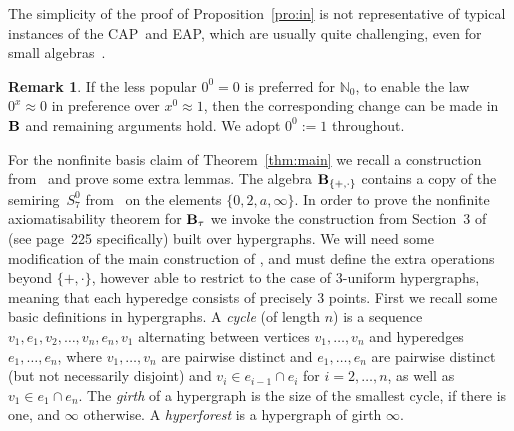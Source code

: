 \documentclass[eqnor,reqno]{amsart}
\theoremstyle{plain}
\theoremstyle{definition}
\newtheorem{remark}[thm]{Remark}
\newcommand{\EAP}{\textsf{EAP}}
\newcommand{\CAP}{\textsf{CAP}}
\begin{document}
The simplicity of the proof of Proposition~\ref{pro:in} is not representative of typical instances of the \CAP\ and \EAP, which are usually quite challenging, even for small algebras~\cite{asa}.
\begin{remark}
If the less popular $0^0=0$ is preferred for $\mathbb{N}_0$, to enable the law $0^x\approx 0$ in preference over $x^0\approx 1$, then the corresponding change can be made in ${\bf B}$ and remaining arguments hold.  We adopt $0^0:=1$ throughout.
\end{remark}

For the nonfinite basis claim of Theorem~\ref{thm:main} we recall a construction from~\cite{JRZ} and prove some extra lemmas.
The algebra ${\bf B}_{\{+,\cdot\}}$ contains a copy of the semiring~$S_7^0$ from~\cite{WRZ} on the elements $\{0,2,a,\infty\}$.
In order to prove the nonfinite axiomatisability theorem for ${\bf B}_\tau$ we invoke the construction from Section~3 of~\cite{JRZ} (see page~225 specifically) built over hypergraphs.  
We will need some modification of the main construction of  \cite{JRZ}, and must define the extra operations beyond $\{+,\cdot\}$, however able to restrict to the case of $3$-uniform hypergraphs, meaning that each hyperedge consists of precisely $3$ points.  
First we recall some basic definitions in hypergraphs.
A \emph{cycle} (of length $n$) is a sequence $v_1,e_1,v_2,\dots, v_{n},e_{n},v_1$ alternating between vertices $v_1,\dots,v_n$ and hyperedges $e_1,\dots,e_n$, where $v_1,\dots,v_n$ are pairwise distinct and $e_1,\dots,e_n$ are pairwise distinct (but not necessarily disjoint) and $v_i\in e_{i-1}\cap e_{i}$ for $i=2,\dots,n$, as well as $v_1\in e_1\cap e_n$.  
The \emph{girth} of a hypergraph is the size of the smallest cycle, if there is one, and $\infty$ otherwise.  A \emph{hyperforest} is a hypergraph of girth $\infty$.  
\end{document}
